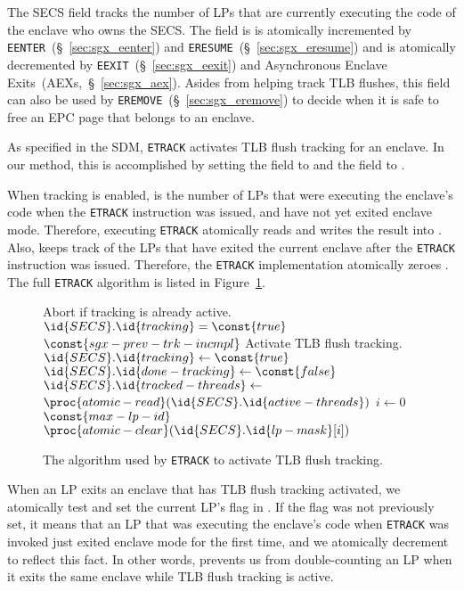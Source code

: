 The  SECS field tracks the number of LPs that are currently
executing the code of the enclave who owns the SECS. The field is is atomically
incremented by \texttt{EENTER}~(\S~\ref{sec:sgx_eenter}) and
\texttt{ERESUME}~(\S~\ref{sec:sgx_eresume}) and is atomically decremented by
\texttt{EEXIT}~(\S~\ref{sec:sgx_eexit}) and Asynchronous Enclave
Exits~(AEXs,~\S~\ref{sec:sgx_aex}). Asides from helping track TLB flushes, this
field can also be used by \texttt{EREMOVE}~(\S~\ref{sec:sgx_eremove}) to decide
when it is safe to free an EPC page that belongs to an enclave.

As specified in the SDM, \texttt{ETRACK} activates TLB flush tracking for an
enclave. In our method, this is accomplished by setting the  field
to  and the  field to .

When tracking is enabled,  is the number of LPs that were
executing the enclave's code when the \texttt{ETRACK} instruction was issued,
and have not yet exited enclave mode. Therefore, executing \texttt{ETRACK}
atomically reads  and writes the result into
. Also,  keeps track of the LPs that have
exited the current enclave after the \texttt{ETRACK} instruction was issued.
Therefore, the \texttt{ETRACK} implementation atomically zeroes .
The full \texttt{ETRACK} algorithm is listed in
Figure~\ref{fig:sgx_tracking_etrack}.

\begin{figure}[hbt]
  \begin{codebox}
  \zi \Comment Abort if tracking is already active.
  \li \If $\id{SECS}.\id{tracking} = \const{true}$
  \li   \Then \Return $\const{sgx-prev-trk-incmpl}$
        \End
  \zi \Comment Activate TLB flush tracking.
  \li $\id{SECS}.\id{tracking} \gets \const{true}$
  \li $\id{SECS}.\id{done-tracking} \gets \const{false}$
  \li $\id{SECS}.\id{tracked-threads} \gets$
      \Indentmore
  \zi $\proc{atomic-read}(\id{SECS}.\id{active-threads})$
      \End
  \li \For $i \gets 0$ \To $\const{max-lp-id}$
  \li   \Do
          $\proc{atomic-clear}(\id{SECS}.\id{lp-mask}[i])$
        \End
  \end{codebox}
  \caption{
    The algorithm used by \texttt{ETRACK} to activate TLB flush tracking.
  }
  \label{fig:sgx_tracking_etrack}
\end{figure}

When an LP exits an enclave that has TLB flush tracking activated, we
atomically test and set the current LP's flag in . If the flag was
not previously set, it means that an LP that was executing the enclave's code
when \texttt{ETRACK} was invoked just exited enclave mode for the first time,
and we atomically decrement  to reflect this fact. In other
words,  prevents us from double-counting an LP when it exits the
same enclave while TLB flush tracking is active.

